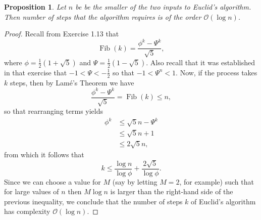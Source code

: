 \documentclass{article}
\newtheorem{proposition}{Proposition}
\DeclareMathOperator{\fib}{Fib}
\begin{document}

\begin{proposition}
  Let $n$ be be the smaller of the two inputs to Euclid's algorithm.  Then
  number of steps that the algorithm requires is of the order
  $\mathcal{O}(\log n)$.
\end{proposition}

\begin{proof}
  Recall from Exercise 1.13 that
  \begin{equation*}
    \fib(k) = \frac{\phi^k - \Psi^k}{\sqrt{5}},
  \end{equation*}
  where $\phi = \frac{1}{2}(1 + \sqrt{5})$ and
  $\Psi = \frac{1}{2}(1 - \sqrt{5})$.  Also recall that it was established in
  that exercise that $-1 < \Psi < -\frac{1}{2}$ so that $-1 < \Psi^n < 1$.  Now,
  if the process takes $k$ steps, then by Lam\'e's Theorem we have
  \begin{equation*}
    \frac{\phi^k - \Psi^k}{\sqrt{5}} = \fib(k) \leq n,
  \end{equation*}
  so that rearranging terms yields
  \begin{align*}
    \phi^k &\leq \sqrt{5} n - \Psi^k \\
           &\leq \sqrt{5} n + 1 \\
           &\leq 2\sqrt{5} n,
  \end{align*}
  from which it follows that
  \begin{equation*}
    k \leq \frac{ \log n }{ \log\phi } + \frac{ 2\sqrt{5} }{ \log\phi }.
  \end{equation*}
  Since we can choose a value for $M$ (say by letting $M = 2$, for example) such
  that for large values of $n$ then $M \log n$ is larger than the right-hand
  side of the previous inequality, we conclude that the number of steps $k$ of
  Euclid's algorithm has complexity $\mathcal{O}(\log n)$.
\end{proof}




\end{document}
